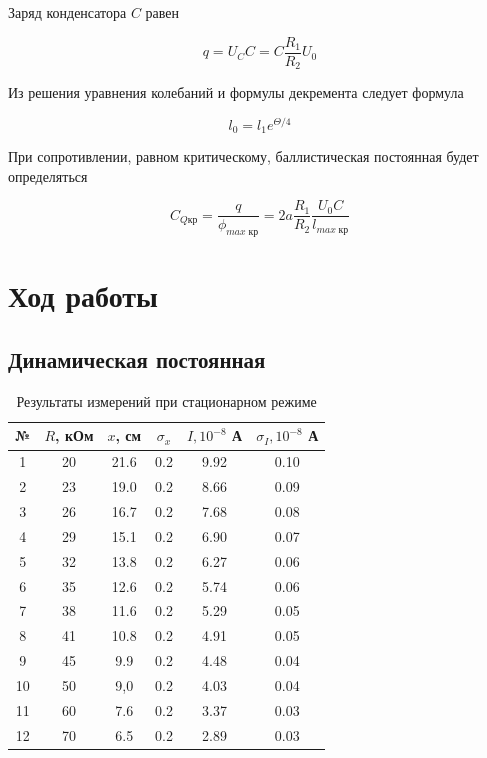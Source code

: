 \documentclass[12pt]{kiarticle} %
\begin{document}
	 Заряд конденсатора $ C $ равен 
	 
	 \begin{equation}\label{}
	 q = U_C C = C \dfrac{R_1}{R_2}U_0
	 \end{equation}
	 
	 Из решения уравнения колебаний и формулы декремента следует формула 
	 
	 \begin{equation}\label{}
	 l_0 = l_1 e^{\Theta/4}
	 \end{equation}
	 
	 При сопротивлении, равном критическому, баллистическая постоянная будет определяться
	 
	 \begin{equation}
	 C_{Q кр} = \dfrac{q}{\phi_{max \; кр}} = 2a\dfrac{R_1}{R_2}\dfrac{U_0C}{l_{max \; кр}}
	 \label{C}
	 \end{equation}
	 
	 \section{Ход работы}
	 
	 \subsection{Динамическая постоянная}
	 
	 	 \begin{table}[h]
	 	\centering
	 	\caption{Результаты измерений при стационарном режиме}
	 	\begin{tabular}{|c|c|c|c|c|c|}
	 		\hline
	 		№ & $ R $, кОм & $ x $, см & $ \sigma_x $ & $ I, 10^{-8} $ А & $ \sigma_I, 10^{-8} $ А\\
	 		\hline
	 		1 & 20 & 21.6 & 0.2 & 9.92 & 0.10 \\
	 		2 & 23 & 19.0 & 0.2 & 8.66 & 0.09 \\
	 		3 & 26 & 16.7 & 0.2 & 7.68 & 0.08 \\
	 		4 & 29 & 15.1 & 0.2 & 6.90 & 0.07 \\
	 		5 & 32 & 13.8 & 0.2 & 6.27 & 0.06 \\
	 		6 & 35 & 12.6 & 0.2 & 5.74 & 0.06 \\
	 		7 & 38 & 11.6 & 0.2 & 5.29 & 0.05 \\
	 		8 & 41 & 10.8 & 0.2 & 4.91 & 0.05 \\
	 		9 & 45 & 9.9 & 0.2 & 4.48 & 0.04 \\
	 		10 & 50 & 9,0 & 0.2 & 4.03 & 0.04 \\
	 		11 & 60 & 7.6 & 0.2 & 3.37 & 0.03 \\
	 		12 & 70 & 6.5 & 0.2 & 2.89 & 0.03 \\
	 		\hline
	 	\end{tabular}%
	 	\label{resI}%
	 \end{table}%
	 
\end{document}
